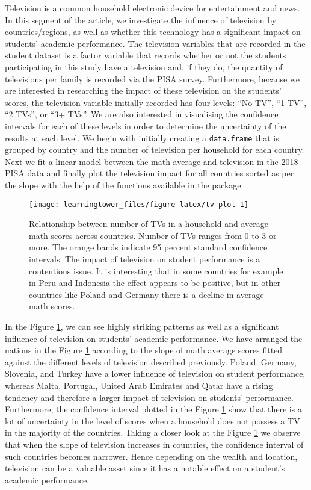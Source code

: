 Television is a common household electronic device for entertainment and news. In this segment of the article, we investigate the influence of television by countries/regions, as well as whether this technology has a significant impact on students' academic performance. The television variables that are recorded in the student dataset is a factor variable that records whether or not the students participating in this study have a television and, if they do, the quantity of televisions per family is recorded via the PISA survey. Furthermore, because we are interested in researching the impact of these television on the students' scores, the television variable initially recorded has four levels: ``No TV'', ``1 TV'', ``2 TVs'', or ``3+ TVs''. We are also interested in visualising the confidence intervals for each of these levels in order to determine the uncertainty of the results at each level. We begin with initially creating a \texttt{data.frame} that is grouped by country and the number of television per household for each country. Next we fit a linear model between the math average and television in the 2018 PISA data and finally plot the television impact for all countries sorted as per the slope with the help of the functions available in the  \citep{ggplot2} package.

\begin{figure}[H]
\texttt{[image: learningtower\_files/figure-latex/tv-plot-1]} \caption{Relationship  between number of TVs in a household and average math scores across countries. Number of TVs ranges from 0 to 3 or more. The orange bands indicate 95 percent standard confidence intervals. The impact of television on student performance is a contentious issue. It is interesting that in some countries for example in Peru and Indonesia the effect appears to be positive, but in other countries like Poland and Germany there is a decline in average math scores.}\label{fig:tv-plot}
\end{figure}

In the Figure \ref{fig:tv-plot}, we can see highly striking patterns as well as a significant influence of television on students' academic performance. We have arranged the nations in the Figure \ref{fig:tv-plot} according to the slope of math average scores fitted against the different levels of television described previously. Poland, Germany, Slovenia, and Turkey have a lower influence of television on student performance, whereas Malta, Portugal, United Arab Emirates and Qatar have a rising tendency and therefore a larger impact of television on students' performance. Furthermore, the confidence interval plotted in the Figure \ref{fig:tv-plot} show that there is a lot of uncertainty in the level of scores when a household does not possess a TV in the majority of the countries. Taking a closer look at the Figure \ref{fig:tv-plot} we observe that when the slope of television increases in countries, the confidence interval of such countries becomes narrower. Hence depending on the wealth and location, television can be a valuable asset since it has a notable effect on a student's academic performance.

